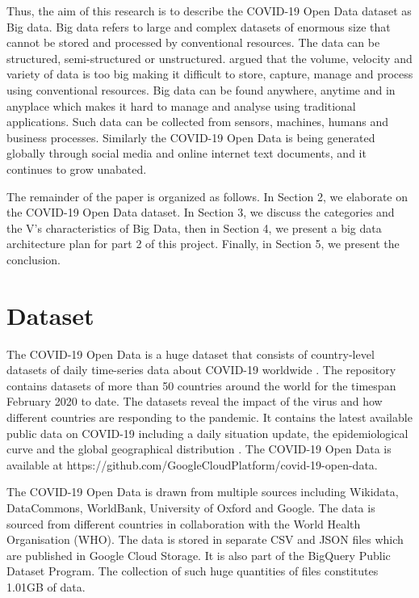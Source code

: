 \documentclass[12pt,letterpaper, twoside]{article}
\begin{document}
Thus, the aim of this research is to describe the COVID-19 Open Data dataset as Big data. Big data refers to large and complex datasets of enormous size that cannot be stored and processed by conventional resources\cite{Grolinger}. The data can be structured, semi-structured or unstructured. \cite{Owais} argued that the volume, velocity and variety of data is too big making it difficult to store, capture, manage and process using conventional resources. Big data can be found anywhere, anytime and in anyplace which makes it hard to manage and analyse using traditional applications\cite{Owais}. Such data can be collected from sensors, machines, humans and business processes. Similarly the COVID-19 Open Data is being generated globally through social media and online internet text documents, and  it continues to grow unabated. 

The remainder of the paper is organized as follows. In Section 2, we elaborate on the COVID-19 Open Data dataset. In Section 3, we discuss the categories and the V's characteristics of Big Data, then in Section 4, we present a big data architecture plan for part 2 of this project. Finally, in Section 5, we present the conclusion.

\section{Dataset} 
The COVID-19 Open Data is a huge dataset that consists of country-level datasets of daily time-series data about COVID-19 worldwide \cite{covid-19}. The repository contains datasets of more than 50 countries around the world for the timespan February 2020 to date. The datasets reveal the impact of the virus and how different countries are responding to the pandemic.  It contains the latest available public data on COVID-19 including a daily situation update, the epidemiological curve and the global geographical distribution \cite{covid-19}. The COVID-19 Open Data is available at https://github.com/GoogleCloudPlatform/covid-19-open-data.

The COVID-19 Open Data is drawn from multiple sources including Wikidata, DataCommons, WorldBank, University of Oxford and Google. The data is sourced from different countries in collaboration with the World Health Organisation (WHO). The data is stored in separate CSV and JSON files which are published in Google Cloud Storage. It is also part of the BigQuery Public Dataset Program. The collection of such huge quantities of files constitutes 1.01GB of data. 
\end{document}
